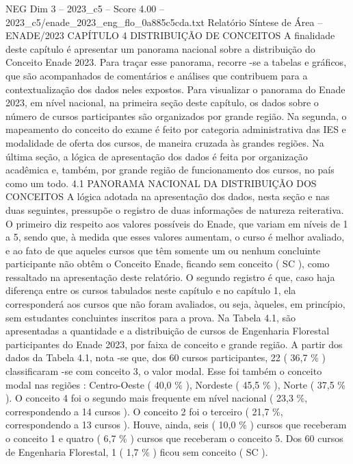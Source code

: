 \begin{textsample}{NEG Dim 3 – 2023\_c5 – Score 4.00 – 2023\_c5/enade\_2023\_eng\_flo\_0a885c5cda.txt}  \label{ex:f3_neg_233}
Relatório Síntese de Área – ENADE/2023 CAPÍTULO 4 DISTRIBUIÇÃO DE CONCEITOS A finalidade deste capítulo é apresentar um panorama nacional sobre a distribuição do Conceito Enade 2023.
Para traçar esse panorama, recorre -se a tabelas e gráficos, que são acompanhados de comentários e análises que contribuem para a contextualização dos dados neles expostos.
Para visualizar o panorama do Enade 2023, em nível nacional, na primeira seção deste capítulo, os dados sobre o número de cursos participantes são organizados por grande região.
Na segunda, o mapeamento do conceito do exame é feito por categoria administrativa das IES e modalidade de oferta dos cursos, de maneira cruzada às grandes regiões.
Na última seção, a lógica de apresentação dos dados é feita por organização acadêmica e, também, por grande região de funcionamento dos cursos, no país como um todo. 4.1 PANORAMA NACIONAL DA DISTRIBUIÇÃO DOS CONCEITOS A lógica adotada na apresentação dos dados, nesta seção e nas duas seguintes, pressupõe o registro de duas informações de natureza reiterativa.
O primeiro diz respeito aos valores possíveis do Enade, que variam em níveis de 1 a 5, sendo que, à medida que esses valores aumentam, o curso é melhor avaliado, e ao fato de que aqueles cursos que têm somente um ou nenhum concluinte participante não obtêm o Conceito Enade, ficando sem conceito ( SC ), como ressaltado na apresentação deste relatório.
O segundo registro é que, caso haja diferença entre os cursos tabulados neste capítulo e no capítulo 1, ela corresponderá aos cursos que não foram avaliados, ou seja, àqueles, em princípio, sem estudantes concluintes inscritos para a prova.
Na Tabela 4.1, são apresentadas a quantidade e a distribuição de cursos de Engenharia Florestal participantes do Enade 2023, por faixa de conceito e grande região.
A partir dos dados da Tabela 4.1, nota -se que, dos 60 cursos participantes, 22 ( 36,7 \% ) classificaram -se com conceito 3, o valor modal.
Esse foi também o conceito modal nas regiões : Centro-Oeste ( 40,0 \% ), Nordeste ( 45,5 \% ), Norte ( 37,5 \% ).
O conceito 4 foi o segundo mais frequente em nível nacional ( 23,3 \%, correspondendo a 14 cursos ).
O conceito 2 foi o terceiro ( 21,7 \%, correspondendo a 13 cursos ).
Houve, ainda, seis ( 10,0 \% ) cursos que receberam o conceito 1 e quatro ( 6,7 \% ) cursos que receberam o conceito 5.
Dos 60 cursos de Engenharia Florestal, 1 ( 1,7 \% ) ficou sem conceito ( SC ).

\end{textsample}
